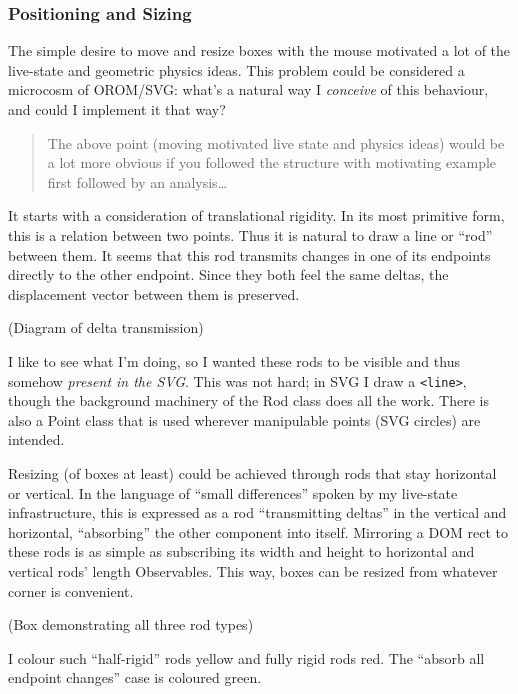 \documentclass[english,submission]{programming}
\begin{document}
  \hypertarget{positioning-and-sizing}{%
  \subsubsection{Positioning and Sizing}\label{positioning-and-sizing}}

  The simple desire to move and resize boxes with the mouse motivated a
  lot of the live-state and geometric physics ideas. This problem could be
  considered a microcosm of OROM/SVG: what's a natural way I
  \emph{conceive} of this behaviour, and could I implement it that way?

  \begin{quote}
  The above point (moving motivated live state and physics ideas) would be
  a lot more obvious if you followed the structure with motivating example
  first followed by an analysis\ldots{}
  \end{quote}

  It starts with a consideration of translational rigidity. In its most
  primitive form, this is a relation between two points. Thus it is
  natural to draw a line or ``rod'' between them. It seems that this rod
  transmits changes in one of its endpoints directly to the other
  endpoint. Since they both feel the same deltas, the displacement vector
  between them is preserved.

  (Diagram of delta transmission)

  I like to see what I'm doing, so I wanted these rods to be visible and
  thus somehow \emph{present in the SVG}. This was not hard; in SVG I draw
  a \texttt{\textless{}line\textgreater{}}, though the background
  machinery of the Rod class does all the work. There is also a Point
  class that is used wherever manipulable points (SVG circles) are
  intended.

  Resizing (of boxes at least) could be achieved through rods that stay
  horizontal or vertical. In the language of ``small differences'' spoken
  by my live-state infrastructure, this is expressed as a rod
  ``transmitting deltas'' in the vertical and horizontal, ``absorbing''
  the other component into itself. Mirroring a DOM rect to these rods is
  as simple as subscribing its width and height to horizontal and vertical
  rods' length Observables. This way, boxes can be resized from whatever
  corner is convenient.

  (Box demonstrating all three rod types)

  I colour such ``half-rigid'' rods yellow and fully rigid rods red. The
  ``absorb all endpoint changes'' case is coloured green.
\end{document}
